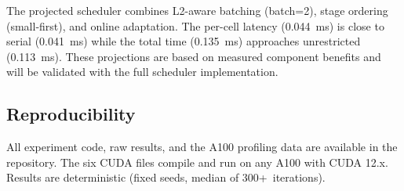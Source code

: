 The projected scheduler combines L2-aware batching (batch=2), stage ordering (small-first), and online adaptation. The per-cell latency (0.044~ms) is close to serial (0.041~ms) while the total time (0.135~ms) approaches unrestricted (0.113~ms). These projections are based on measured component benefits and will be validated with the full scheduler implementation.

\subsection{Reproducibility}

All experiment code, raw results, and the A100 profiling data are available in the repository. The six CUDA files compile and run on any A100 with CUDA 12.x. Results are deterministic (fixed seeds, median of 300+~iterations).
